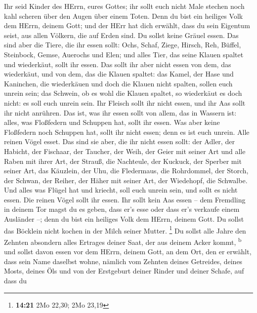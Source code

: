  Ihr seid Kinder des HErrn, eures Gottes; ihr sollt euch
nicht Male stechen noch kahl scheren über den Augen über einem Toten.
 Denn du bist ein heiliges Volk dem HErrn, deinem Gott;
und der HErr hat dich erwählt, dass du sein Eigentum seist, aus allen
Völkern, die auf Erden sind.  Du sollst keine Gräuel
essen.  Das sind aber die Tiere, die ihr essen sollt:
Ochs, Schaf, Ziege,  Hirsch, Reh, Büffel, Steinbock,
Gemse, Auerochs und Elen;  und alles Tier, das seine
Klauen spaltet und wiederkäut, sollt ihr essen.  Das sollt
ihr aber nicht essen von dem, das wiederkäut, und von dem, das die
Klauen spaltet: das Kamel, der Hase und Kaninchen, die wiederkäuen und
doch die Klauen nicht spalten, sollen euch unrein sein; 
das Schwein, ob es wohl die Klauen spaltet, so wiederkäut es doch nicht:
es soll euch unrein sein. Ihr Fleisch sollt ihr nicht essen, und ihr Aas
sollt ihr nicht anrühren.  Das ist, was ihr essen sollt
von allem, das in Wassern ist: alles, was Floßfedern und Schuppen hat,
sollt ihr essen.  Was aber keine Floßfedern noch Schuppen
hat, sollt ihr nicht essen; denn es ist euch unrein. 
Alle reinen Vögel esset.  Das sind sie aber, die ihr
nicht essen sollt: der Adler, der Habicht, der Fischaar, 
der Taucher, der Weih, der Geier mit seiner Art  und alle
Raben mit ihrer Art,  der Strauß, die Nachteule, der
Kuckuck, der Sperber mit seiner Art,  das Käuzlein, der
Uhu, die Fledermaus,  die Rohrdommel, der Storch, der
Schwan,  der Reiher, der Häher mit seiner Art, der
Wiedehopf, die Schwalbe.  Und alles was Flügel hat und
kriecht, soll euch unrein sein, und sollt es nicht essen.
 Die reinen Vögel sollt ihr essen.  Ihr
sollt kein Aas essen -- dem Fremdling in deinem Tor magst du es geben,
dass er's esse oder dass er's verkaufe einem Ausländer --; denn du bist
ein heiliges Volk dem HErrn, deinem Gott. Du sollst das Böcklein nicht
kochen in der Milch seiner Mutter. \footnote{\textbf{14:21} 2Mo 22,30;
  2Mo 23,19}  Du sollst alle Jahre den Zehnten absondern
alles Ertrages deiner Saat, der aus deinem Acker kommt,
\textsuperscript{b}  und sollst davon essen vor dem
HErrn, deinem Gott, an dem Ort, den er erwählt, dass sein Name daselbst
wohne, nämlich vom Zehnten deines Getreides, deines Mosts, deines Öls
und von der Erstgeburt deiner Rinder und deiner Schafe, auf dass du

